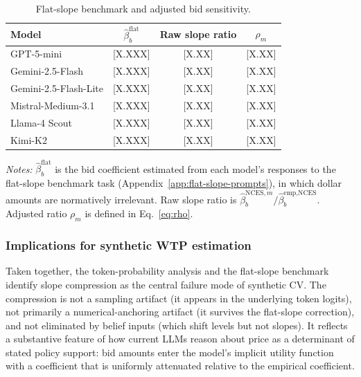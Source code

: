 \documentclass[12pt]{article}
\begin{document}
\begin{table}[h]
    \centering
    \caption{Flat-slope benchmark and adjusted bid sensitivity.}
    \label{tab:flat-slope}
    \begin{threeparttable}
    \begin{tabular}{lccc}
        \toprule
        Model & $\hat{\beta}_b^{\text{flat}}$ & Raw slope ratio & $\rho_m$ \\
        \midrule
        GPT-5-mini             & [X.XXX] & [X.XX] & [X.XX] \\
        Gemini-2.5-Flash       & [X.XXX] & [X.XX] & [X.XX] \\
        Gemini-2.5-Flash-Lite  & [X.XXX] & [X.XX] & [X.XX] \\
        Mistral-Medium-3.1     & [X.XXX] & [X.XX] & [X.XX] \\
        Llama-4 Scout          & [X.XXX] & [X.XX] & [X.XX] \\
        Kimi-K2                & [X.XXX] & [X.XX] & [X.XX] \\
        \bottomrule
    \end{tabular}
    \begin{tablenotes}\footnotesize
    \item \textit{Notes:} $\hat{\beta}_b^{\text{flat}}$ is the bid coefficient estimated from each model's responses to the flat-slope benchmark task (Appendix~\ref{app:flat-slope-prompts}), in which dollar amounts are normatively irrelevant. Raw slope ratio is $\hat{\beta}_b^{\text{NCES}, m} / \hat{\beta}_b^{\text{emp,NCES}}$. Adjusted ratio $\rho_m$ is defined in Eq.~\ref{eq:rho}.
    \end{tablenotes}
    \end{threeparttable}
\end{table}

\subsubsection{Implications for synthetic WTP estimation}

Taken together, the token-probability analysis and the flat-slope benchmark identify slope compression as the central failure mode of synthetic CV. The compression is not a sampling artifact (it appears in the underlying token logits), not primarily a numerical-anchoring artifact (it survives the flat-slope correction), and not eliminated by belief inputs (which shift levels but not slopes). It reflects a substantive feature of how current LLMs reason about price as a determinant of stated policy support: bid amounts enter the model's implicit utility function with a coefficient that is uniformly attenuated relative to the empirical coefficient.
\end{document}
